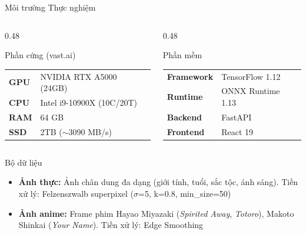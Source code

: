 \documentclass[aspectratio=169,12pt]{beamer}
\begin{document}
\begin{frame}{Môi trường Thực nghiệm}
\begin{columns}[T]
\begin{column}{0.48\textwidth}
\begin{block}{Phần cứng (vast.ai)}
\small
\begin{tabular}{ll}
\textbf{GPU} & NVIDIA RTX A5000 (24GB) \\
\textbf{CPU} & Intel i9-10900X (10C/20T) \\
\textbf{RAM} & 64 GB \\
\textbf{SSD} & 2TB ($\sim$3090 MB/s) \\
\end{tabular}
\end{block}
\end{column}
\begin{column}{0.48\textwidth}
\begin{block}{Phần mềm}
\small
\begin{tabular}{ll}
\textbf{Framework} & TensorFlow 1.12 \\
\textbf{Runtime} & ONNX Runtime 1.13 \\
\textbf{Backend} & FastAPI \\
\textbf{Frontend} & React 19 \\
\end{tabular}
\end{block}
\end{column}
\end{columns}

\vspace{0.3cm}
\begin{block}{Bộ dữ liệu}
\begin{itemize}
    \small
    \item \textbf{Ảnh thực:} Ảnh chân dung đa dạng (giới tính, tuổi, sắc tộc, ánh sáng). Tiền xử lý: Felzenszwalb superpixel ($\sigma$=5, k=0.8, min\_size=50)
    \item \textbf{Ảnh anime:} Frame phim Hayao Miyazaki (\textit{Spirited Away}, \textit{Totoro}), Makoto Shinkai (\textit{Your Name}). Tiền xử lý: Edge Smoothing
\end{itemize}
\end{block}
\end{frame}
\end{document}
